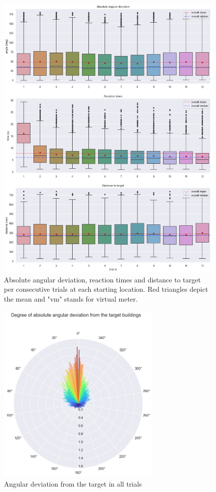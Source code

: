 \begin{figure}[!htb]
	\centering
	\includegraphics[width=140mm]{figures/ard_per_trial_order_of_each_starting_location_23.png}
	\caption[Box plot per consecutive trials at each starting location]{Absolute angular deviation, reaction times and distance to target per consecutive trials at each starting location. Red triangles depict the mean and "vm" stands for virtual meter.}
	\label{fig:ard_per_trial_order_of_each_starting_location_23}
\end{figure}

\begin{figure}[!htb]
	\centering
	\includegraphics[width=80mm]{figures/deviation_degree_all_23.png}
	\caption[Angular deviation from the target in all trials]{Angular deviation from the target in all trials}
	\label{fig:deviation_degree_all_23}
\end{figure}

